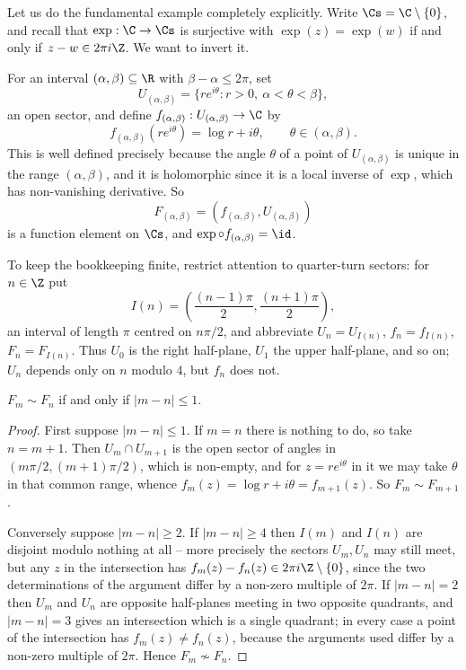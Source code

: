 Let us do the fundamental example completely explicitly. Write $\Cs = \C \setminus \{0\}$,
and recall that $\exp : \C \to \Cs$ is surjective with $\exp(z) = \exp(w)$ if and only if
$z - w \in 2\pi i \Z$. We want to invert it.

For an interval $(\alpha, \beta) \subseteq \R$ with $\beta - \alpha \leq 2\pi$, set
$$
U_{(\alpha, \beta)} = \{ r e^{i\theta} : r > 0, \ \alpha < \theta < \beta\},
$$
an open sector, and define $f_{(\alpha,\beta)} : U_{(\alpha,\beta)} \to \C$ by
$$
f_{(\alpha,\beta)}(re^{i\theta}) = \log r + i \theta, \qquad \theta \in (\alpha,\beta).
$$
This is well defined precisely because the angle $\theta$ of a point of
$U_{(\alpha,\beta)}$ is unique in the range $(\alpha,\beta)$, and it is holomorphic since
it is a local inverse of $\exp$, which has non-vanishing derivative. So
$$
F_{(\alpha,\beta)} = (f_{(\alpha,\beta)}, U_{(\alpha,\beta)})
$$
is a function element on $\Cs$, and $\exp \circ f_{(\alpha,\beta)} = \id$.

To keep the bookkeeping finite, restrict attention to quarter-turn sectors: for
$n \in \Z$ put
$$
I(n) = \left( \frac{(n-1)\pi}{2}, \frac{(n+1)\pi}{2} \right),
$$
an interval of length $\pi$ centred on $n\pi/2$, and abbreviate $U_n = U_{I(n)}$,
$f_n = f_{I(n)}$, $F_n = F_{I(n)}$. Thus $U_0$ is the right half-plane, $U_1$ the upper
half-plane, and so on; $U_n$ depends only on $n$ modulo $4$, but $f_n$ does not.

\begin{proposition}\label{prop:logelements}
	$F_m \sim F_n$ if and only if $|m - n| \leq 1$.
\end{proposition}

\begin{proof}
	First suppose $|m-n| \leq 1$. If $m = n$ there is nothing to do, so take $n = m+1$.
	Then $U_m \cap U_{m+1}$ is the open sector of angles in $(m\pi/2, (m+1)\pi/2)$, which
	is non-empty, and for $z = re^{i\theta}$ in it we may take $\theta$ in that common
	range, whence $f_m(z) = \log r + i\theta = f_{m+1}(z)$. So $F_m \sim F_{m+1}$.

	Conversely suppose $|m - n| \geq 2$. If $|m - n| \geq 4$ then $I(m)$ and $I(n)$ are
	disjoint modulo nothing at all -- more precisely the sectors $U_m, U_n$ may still
	meet, but any $z$ in the intersection has $f_m(z) - f_n(z) \in 2\pi i \Z \setminus \{0\}$,
	since the two determinations of the argument differ by a non-zero multiple of $2\pi$.
	If $|m-n| = 2$ then $U_m$ and $U_n$ are opposite half-planes meeting in two opposite
	quadrants, and $|m - n| = 3$ gives an intersection which is a single quadrant; in every
	case a point of the intersection has $f_m(z) \neq f_n(z)$, because the arguments used
	differ by a non-zero multiple of $2\pi$. Hence $F_m \not\sim F_n$.
\end{proof}

